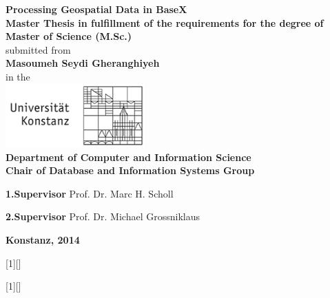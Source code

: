 \documentclass[a4paper,12pt]{article}
\begin{document}
\begin{titlepage}
\begin{center}
{\LARGE \textbf{Processing Geospatial Data in BaseX}}
\\[1cm]
{\Large \textbf{Master Thesis in fulfillment of the requirements for the degree of
Master of Science (M.Sc.)}}
\\[1cm]
{\Large submitted from}
\\[0.5cm]
{\LARGE \textbf{Masoumeh Seydi Gheranghiyeh}}
\\[0.5cm]
{\Large in the}
\\[0.5cm]
\includegraphics[width=0.4\textwidth]{logo.png}
\\[1cm]
{\Large \textbf{Department of Computer and Information Science}}
\\[1cm]
{\Large \textbf{Chair of Database and Information Systems Group}}
\\[2cm]
\begin{minipage}[c]{0.8\textwidth}
\begin{description}[style=multiline]
 \item {\Large \textbf{1.Supervisor} Prof. Dr. Marc H. Scholl}
 \item {\Large \textbf{2.Supervisor} Prof. Dr. Michael Grossniklaus}
\end{description}
\end{minipage}
\vfill
{\LARGE \textbf{Konstanz, 2014}}
\end{center}
\end{titlepage}


[1][]{
\lstset{#1}}{}

[1][]{
\lstset{#1}}{}
\end{document}

